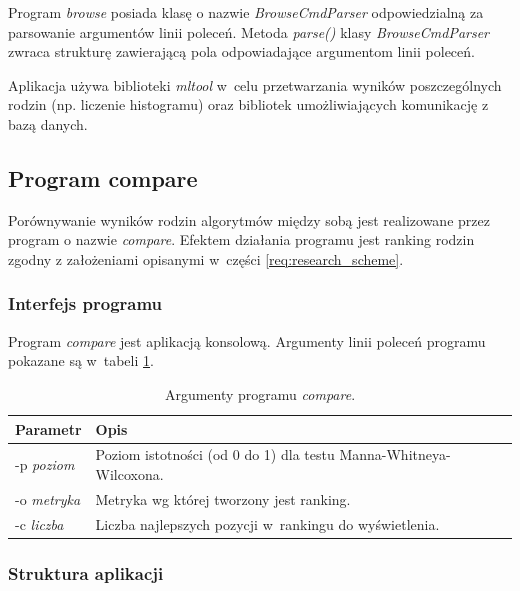 \documentclass[../thesis.tex]{subfiles}
\begin{document}
Program \emph{browse} posiada klasę o nazwie \emph{BrowseCmdParser} odpowiedzialną za parsowanie argumentów linii poleceń. Metoda \emph{parse()} klasy \emph{BrowseCmdParser} zwraca strukturę zawierającą pola odpowiadające argumentom linii poleceń. 

Aplikacja używa biblioteki \emph{mltool} w~celu przetwarzania wyników poszczególnych rodzin (np. liczenie histogramu) oraz bibliotek umożliwiających komunikację z bazą danych.

\subsection{Program compare}

Porównywanie wyników rodzin algorytmów między sobą jest realizowane przez program o nazwie \emph{compare}. Efektem działania programu jest ranking rodzin zgodny z założeniami opisanymi w~części \ref{req:research_scheme}.

\subsubsection{Interfejs programu}

Program \emph{compare} jest aplikacją konsolową. Argumenty linii poleceń programu pokazane są w~tabeli \ref{proj:table_compare_args}.

\begin{table}[h]
\begin{center}
\begin{tabular}{ | l | p{110mm} | }
\hline
\rowcolor{lightgray} Parametr & Opis \\\hline

-p \emph{poziom} & Poziom istotności (od 0 do 1) dla testu Manna-Whitneya-Wilcoxona.\\\hline
-o \emph{metryka} & Metryka wg której tworzony jest ranking.\\\hline
-c \emph{liczba} & Liczba najlepszych pozycji w~rankingu do wyświetlenia.\\\hline

\end{tabular}
\caption{Argumenty programu \emph{compare}.}
\label{proj:table_compare_args}
\end{center}
\end{table}

\subsubsection{Struktura aplikacji}
\end{document}
